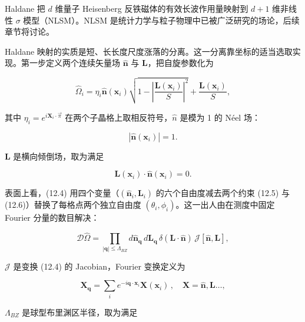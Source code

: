 Haldane 把 $d$ 维量子 Heisenberg 反铁磁体的有效长波作用量映射到 $d + 1$ 维非线性 {$\sigma$} 模型（NLSM）。NLSM 是统计力学与粒子物理中已被广泛研究的场论，后续章节将讨论。

Haldane 映射的实质是短、长长度尺度涨落的分离。这一分离靠坐标的适当选取实现。第一步定义两个连续矢量场 $\hat{\mathbf{n}}$ 与 $\mathbf{L}$，把自旋参数化为

\begin{equation*}
\hat {\Omega} _ {i} = \eta_ {i} \hat {\mathbf {n}} ( \mathbf {x} _ {i} ) \sqrt {1 - \left| \frac {\mathbf {L} ( \mathbf {x} _ {i} )}{S} \right| ^ {2}} + \frac {\mathbf {L} ( \mathbf {x} _ {i} )}{S} ,
\tag{12.4}
\end{equation*}

其中 $\eta_{i}=e^{i\mathbf{X}_{i}\cdot\vec{\pi}}$ 在两个子晶格上取相反符号，$\hat{n}$ 是模为 1 的 Néel 场：

\begin{equation*}
\left| \hat {\mathbf {n}} ( \mathbf {x} _ {i} ) \right| = 1.
\tag{12.5}
\end{equation*}

$\mathbf{L}$ 是横向倾倒场，取为满足

\begin{equation*}
\mathbf {L} ( \mathbf {x} _ {i} ) \cdot \hat {\mathbf {n}} ( \mathbf {x} _ {i} ) = 0.
\tag{12.6}
\end{equation*}

表面上看，(12.4) 用四个变量（$(\hat{\mathbf{n}}_{i}, \mathbf{L}_{i})$ 的六个自由度减去两个约束 (12.5) 与 (12.6)）替换了每格点两个独立自由度 $(\theta_{i}, \phi_{i})$。这一出人由在测度中固定 Fourier 分量的数目解决：

\begin{equation*}
\mathcal {D} \hat {\Omega} = \prod_{| \mathbf {q} | \leq \Lambda_{BZ}} d \hat {\mathbf {n}} _ {\mathbf {q}} \, d \mathbf {L} _ {\mathbf {q}} \, \delta ( \mathbf {L} \cdot \hat {\mathbf {n}} ) \, \mathcal {J} [ \hat {\mathbf {n}}, \mathbf {L} ] ,
\tag{12.7}
\end{equation*}

$\mathcal{J}$ 是变换 (12.4) 的 Jacobian，Fourier 变换定义为

\begin{equation*}
\mathbf {X} _ {\mathbf {q}} = \sum_ {i} e ^ {- i \mathbf {q} \cdot \mathbf {x} _ {i}} \mathbf {X} ( \mathbf {x} _ {i} ) \, , \quad \mathbf {X} = \hat {\mathbf {n}}, \mathbf {L} \dots ,
\tag{12.8}
\end{equation*}

$\Lambda_{BZ}$ 是球型布里渊区半径，取为满足

